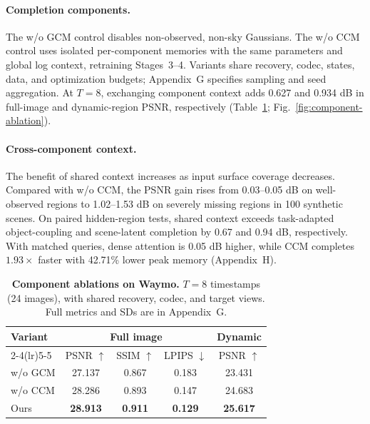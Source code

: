 \paragraph{Completion components.}
The w/o GCM control disables non-observed, non-sky Gaussians. The w/o CCM control uses isolated per-component memories with the same parameters and global log context, retraining Stages~\mbox{3--4}. Variants share recovery, codec, states, data, and optimization budgets; Appendix~G specifies sampling and seed aggregation. At $T=8$, exchanging component context adds 0.627 and 0.934 dB in full-image and dynamic-region PSNR, respectively (Table~\ref{tab:ablation-components}; Fig.~\ref{fig:component-ablation}).

\paragraph{Cross-component context.}
The benefit of shared context increases as input surface coverage decreases. Compared with w/o CCM, the PSNR gain rises from 0.03--0.05 dB on well-observed regions to 1.02--1.53 dB on severely missing regions in 100 synthetic scenes. On paired hidden-region tests, shared context exceeds task-adapted object-coupling and scene-latent completion by 0.67 and 0.94 dB, respectively. With matched queries, dense attention is 0.05 dB higher, while CCM completes $1.93\times$ faster with 42.71\% lower peak memory (Appendix~H).

\begin{table}[!htbp]
  \centering\small
  \caption{\textbf{Component ablations on Waymo.} $T=8$ timestamps (24 images), with shared recovery, codec, and target views. Full metrics and SDs are in Appendix~G.}
  \label{tab:ablation-components}
  \setlength{\tabcolsep}{3pt}
  \renewcommand{\arraystretch}{1.12}
  \begin{tabular*}{\linewidth}{@{\extracolsep{\fill}}lcccc@{}}
    \toprule
    \multirow{2}{*}{Variant} & \multicolumn{3}{c}{Full image} & Dynamic \\
    \cmidrule(lr){2-4}\cmidrule(lr){5-5}
      & PSNR $\uparrow$ & SSIM $\uparrow$ & LPIPS $\downarrow$ & PSNR $\uparrow$ \\
    \midrule
    w/o GCM & 27.137 & 0.867 & 0.183 & 23.431 \\
    w/o CCM & 28.286 & 0.893 & 0.147 & 24.683 \\
    \midrule
    Ours & \textbf{28.913} & \textbf{0.911} & \textbf{0.129} & \textbf{25.617} \\
    \bottomrule
  \end{tabular*}
\end{table}

